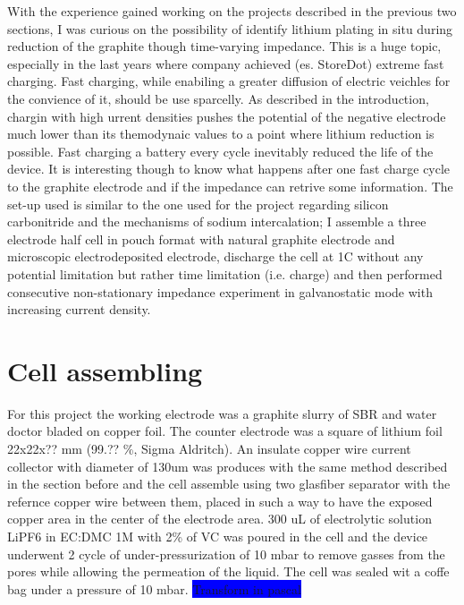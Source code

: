 \label{chap:graphite}

With the experience gained working on the projects described in the previous two sections, I was curious on the possibility of identify lithium plating in situ during reduction of the graphite though time-varying impedance. This is a huge topic, especially in the last years where company achieved (es. StoreDot) extreme fast charging. Fast charging, while enabiling a greater diffusion of electric veichles for the convience of it, should be use sparcelly. \colorbox{BurntOrange}{As described in the introduction}, chargin with high urrent densities pushes the potential of the negative electrode much lower than its themodynaic values to a point where lithium reduction is possible. Fast charging a battery every cycle inevitably reduced the life of the device. It is interesting though to know what happens after one fast charge cycle to the graphite electrode and if the impedance can retrive some information. The set-up used is similar to the one used for the project regarding silicon carbonitride and the mechanisms of sodium intercalation; I assemble a three electrode half cell in pouch format with natural graphite electrode and microscopic electrodeposited electrode, discharge the cell at 1C without any potential limitation but rather time limitation (i.e. charge) and then performed consecutive non-stationary impedance experiment in galvanostatic mode with increasing current density.

\section{Cell assembling}

For this project the working electrode was a graphite slurry of SBR and water doctor bladed on copper foil. The counter electrode was a square of lithium foil 22x22x?? mm (99.?? \%, Sigma Aldritch). An insulate copper wire current collector with diameter of 130um was produces with the same method described in the section before and the cell assemble using two glasfiber separator with the refernce copper wire between them, placed in such a way to have the exposed copper area in the center of the electrode area. 300 uL of electrolytic solution LiPF6 in EC:DMC 1M with 2\% of VC was poured in the cell and the device underwent 2 cycle of under-pressurization of 10 mbar to remove gasses from the pores while allowing the permeation of the liquid. The cell was sealed wit a coffe bag under a pressure of 10 mbar. \colorbox{Blue}{Transform in pascal}

